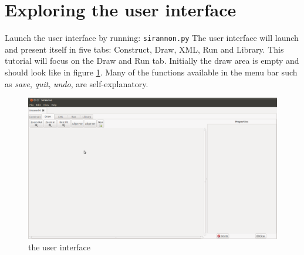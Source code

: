 \documentclass[12pt]{report}
\begin{document}
\section{Exploring the user interface}
Launch the user interface by running:
\texttt{sirannon.py}
The user interface will launch and present itself in five tabs: Construct, Draw, XML, Run and Library. This tutorial will focus on the Draw and Run tab. Initially the draw area is empty and should look like in figure \ref{fig:6}. Many of the functions available in the menu bar such as \textit{save}, \textit{quit}, \textit{undo}, \textellipsis are self-explanatory. 
\begin{figure}[!ht]
\begin{center}
	\includegraphics[width=1.0\textwidth]{./images/ui01.png}
	\caption{the user interface}
	\label{fig:6}
\end{center}
\end{figure}
\newpage
\end{document}
